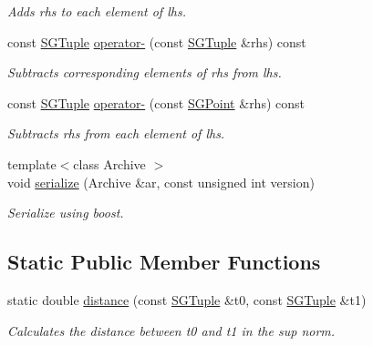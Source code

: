 \begin{DoxyCompactItemize}
\begin{DoxyCompactList}\small\item\em Adds rhs to each element of lhs. \end{DoxyCompactList}\item 
\hypertarget{class_s_g_tuple_aca0dc9024f09628befbd25274366cb79}{const \hyperlink{class_s_g_tuple}{S\+G\+Tuple} \hyperlink{class_s_g_tuple_aca0dc9024f09628befbd25274366cb79}{operator-\/} (const \hyperlink{class_s_g_tuple}{S\+G\+Tuple} \&rhs) const }\label{class_s_g_tuple_aca0dc9024f09628befbd25274366cb79}

\begin{DoxyCompactList}\small\item\em Subtracts corresponding elements of rhs from lhs. \end{DoxyCompactList}\item 
\hypertarget{class_s_g_tuple_a4b0d32414ed5e3df2e78c43d8bc72365}{const \hyperlink{class_s_g_tuple}{S\+G\+Tuple} \hyperlink{class_s_g_tuple_a4b0d32414ed5e3df2e78c43d8bc72365}{operator-\/} (const \hyperlink{class_s_g_point}{S\+G\+Point} \&rhs) const }\label{class_s_g_tuple_a4b0d32414ed5e3df2e78c43d8bc72365}

\begin{DoxyCompactList}\small\item\em Subtracts rhs from each element of lhs. \end{DoxyCompactList}\item 
\hypertarget{class_s_g_tuple_a82a8b8ef3ee0f1ae72d49ad98b43bc54}{{\footnotesize template$<$class Archive $>$ }\\void \hyperlink{class_s_g_tuple_a82a8b8ef3ee0f1ae72d49ad98b43bc54}{serialize} (Archive \&ar, const unsigned int version)}\label{class_s_g_tuple_a82a8b8ef3ee0f1ae72d49ad98b43bc54}

\begin{DoxyCompactList}\small\item\em Serialize using boost. \end{DoxyCompactList}\end{DoxyCompactItemize}
\subsection*{Static Public Member Functions}
\begin{DoxyCompactItemize}
\item 
\hypertarget{class_s_g_tuple_a84f49c6d705bbe457e0e74e32316d25b}{static double \hyperlink{class_s_g_tuple_a84f49c6d705bbe457e0e74e32316d25b}{distance} (const \hyperlink{class_s_g_tuple}{S\+G\+Tuple} \&t0, const \hyperlink{class_s_g_tuple}{S\+G\+Tuple} \&t1)}\label{class_s_g_tuple_a84f49c6d705bbe457e0e74e32316d25b}

\begin{DoxyCompactList}\small\item\em Calculates the distance between t0 and t1 in the sup norm. \end{DoxyCompactList}\end{DoxyCompactItemize}
